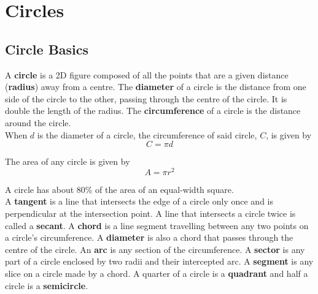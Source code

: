 \section{Circles}

    \subsection{Circle Basics}
        A \textbf{circle} is a 2D figure composed of all the points that are a given distance
        (\textbf{radius}) away from a centre. The \textbf{diameter} of a circle is the distance
        from one side of the circle to the other, passing through the centre of the circle.
        It is double the length of the radius. The \textbf{circumference} of a circle is the
        distance around the circle. \\

        \noindent When $d$ is the diameter of a circle, the circumference of said circle, $C$,
        is given by \\

        \begin{equation*}
            C = \pi d
        \end{equation*}

        \noindent The area of any circle is given by \\

        \begin{equation*}
            A=\pi r^2
        \end{equation*}

        \noindent A circle has about 80\% of the area of an equal-width square. \\

        \noindent A \textbf{tangent} is a line that intersects the edge of a circle only once
        and is perpendicular at the intersection point. A line that intersects a circle twice
        is called a \textbf{secant}. A \textbf{chord} is a line segment travelling between any
        two points on a circle's circumference. A \textbf{diameter} is also a chord that passes
        through the centre of the circle. An \textbf{arc} is any section of the circumference.
        A \textbf{sector} is any part of a circle enclosed by two radii and their intercepted
        arc. A \textbf{segment} is any slice on a circle made by a chord. A quarter of a circle
        is a \textbf{quadrant} and half a circle is a \textbf{semicircle}. \\

